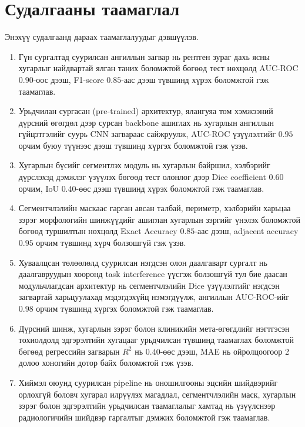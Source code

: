
\section{Судалгааны таамаглал}

Энэхүү судалгаанд дараах таамаглалуудыг дэвшүүлэв.

\begin{enumerate}[nosep]
    \item Гүн сургалтад суурилсан ангиллын загвар нь рентген зураг дахь ясны хугарлыг найдвартай ялган таних боломжтой бөгөөд тест нөхцөлд AUC-ROC $0.90$-оос дээш, F1-score $0.85$-аас дээш түвшинд хүрэх боломжтой гэж таамаглав.
    \item Урьдчилан сургасан (pre-trained) архитектур, ялангуяа том хэмжээний дүрсний өгөгдөл дээр сурсан backbone ашиглах нь хугарлын ангиллын гүйцэтгэлийг суурь CNN загвараас сайжруулж, AUC-ROC үзүүлэлтийг $0.95$ орчим буюу түүнээс дээш түвшинд хүргэх боломжтой гэж үзэв.
    \item Хугарлын бүсийг сегментлэх модуль нь хугарлын байршил, хэлбэрийг дүрслэхэд дэмжлэг үзүүлэх бөгөөд тест олонлог дээр Dice coefficient $0.60$ орчим, IoU $0.40$-өөс дээш түвшинд хүрэх боломжтой гэж таамаглав.
    \item Сегментчлэлийн маскаас гарган авсан талбай, периметр, хэлбэрийн харьцаа зэрэг морфологийн шинжүүдийг ашиглан хугарлын зэргийг үнэлэх боломжтой бөгөөд туршилтын нөхцөлд Exact Accuracy $0.85$-аас дээш, adjacent accuracy $0.95$ орчим түвшинд хүрч болзошгүй гэж үзэв.
    \item Хуваалцсан төлөөлөлд суурилсан нэгдсэн олон даалгаварт сургалт нь даалгавруудын хооронд task interference үүсгэж болзошгүй тул бие даасан модульчлагдсан архитектур нь сегментчлэлийн Dice үзүүлэлтийг нэгдсэн загвартай харьцуулахад мэдэгдэхүйц нэмэгдүүлж, ангиллын AUC-ROC-ийг $0.98$ орчим түвшинд хүргэх боломжтой гэж таамаглав.
    \item Дүрсний шинж, хугарлын зэрэг болон клиникийн мета-өгөгдлийг нэгтгэсэн тохиолдолд эдгэрэлтийн хугацааг урьдчилсан түвшинд таамаглах боломжтой бөгөөд регрессийн загварын $R^2$ нь $0.40$-өөс дээш, MAE нь ойролцоогоор 2 долоо хоногийн дотор байх боломжтой гэж үзэв.
    \item Хиймэл оюунд суурилсан pipeline нь оношилгооны эцсийн шийдвэрийг орлохгүй боловч хугарал илрүүлэх магадлал, сегментчлэлийн маск, хугарлын зэрэг болон эдгэрэлтийн урьдчилсан таамаглалыг хамтад нь үзүүлснээр радиологичийн шийдвэр гаргалтыг дэмжих боломжтой гэж таамаглав.
\end{enumerate}
